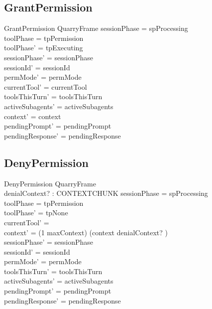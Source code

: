 \documentclass[a4paper,10pt,fleqn]{article}
\begin{document}
\subsection{GrantPermission}

\begin{schema}{GrantPermission}
  QuarryFrame
  \where
  sessionPhase = spProcessing \\
  toolPhase = tpPermission \\
  toolPhase' = tpExecuting \\
  sessionPhase' = sessionPhase \\
  sessionId' = sessionId \\
  permMode' = permMode \\
  currentTool' = currentTool \\
  toolsThisTurn' = toolsThisTurn \\
  activeSubagents' = activeSubagents \\
  context' = context \\
  pendingPrompt' = pendingPrompt \\
  pendingResponse' = pendingResponse
\end{schema}

\subsection{DenyPermission}

\begin{schema}{DenyPermission}
  QuarryFrame \\
  denialContext? : CONTEXTCHUNK
  \where
  sessionPhase = spProcessing \\
  toolPhase = tpPermission \\
  toolPhase' = tpNone \\
  currentTool' = \emptyset \\
  context' = (1 \upto maxContext) \dres (context \cat \langle denialContext? \rangle) \\
  sessionPhase' = sessionPhase \\
  sessionId' = sessionId \\
  permMode' = permMode \\
  toolsThisTurn' = toolsThisTurn \\
  activeSubagents' = activeSubagents \\
  pendingPrompt' = pendingPrompt \\
  pendingResponse' = pendingResponse
\end{schema}
\end{document}
